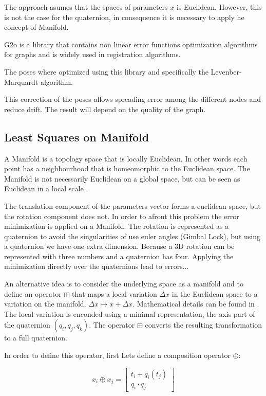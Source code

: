 The approach asumes that the spaces of parameters $x$ is Euclidean. However, this is not the case for the quaternion, 
in consequence it is necessary to apply he concept of Manifold.



G2o is a library that contains non linear error functions optimization 
algorithms for graphs and is widely used in registration algorithms. 

The poses where optimized using this library and specifically the 
Levenber-Marquardt algorithm.

This correction of the poses allows spreading error among the different nodes and reduce drift. The result 
will depend on the quality of the graph.

\subsection{Least Squares on Manifold}

A Manifold is a topology space that is locally Euclidean. In other words each point has a neighbourhood that is 
homeomorphic to the Euclidean space. The Manifold is not necessarily Euclidean on a global space, but can be seen 
as Euclidean in a local scale \cite{manifold}.

The translation component of the parameters vector forms a euclidean space, but the rotation component does not.
In order to afront this problem the error minimization is applied on a Manifold. The rotation is represented as a 
quaternion to avoid the singularities of use euler angles (Gimbal Lock), but using a quaternion we have one extra 
dimension. Because a 3D rotation can be represented with three numbers and a quaternion has four. Applying the 
minimization directly over the quaternions lead to errors...

An alternative idea is to consider the underlying space as a manifold
and to define an operator $\boxplus$ that maps a local variation
$\Delta x$ in the Euclidean space to a variation on the manifold, $\Delta x \mapsto x + \Delta x$. 
Mathematical details can be found in \cite{hertzberg08}. The local variation is enconded using a minimal 
representation, the axis part of the quaternion $(q_i,q_j,q_k)$. The operator $\boxplus$ converts the 
resulting transformation to a full quaternion.

In order to define this operator, first Lets define a composition operator $\oplus$:

$$
x_i \oplus x_j = \begin{bmatrix} t_i + q_i(t_j) \\ q_i \cdot q_j \end{bmatrix}
$$

